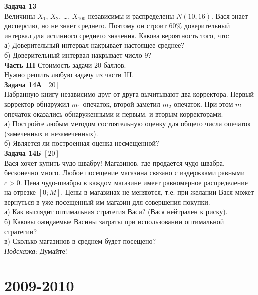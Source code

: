 \documentclass[12pt, a4paper]{article}\usepackage[]{graphicx}\usepackage[]{color}
\begin{document}
\textbf{Задача 13} \\
Величины $X_{1}$, $X_{2}$, \ldots, $X_{100}$ независимы и распределены $N(10,16)$. Вася знает дисперсию, но не знает среднего. Поэтому он строит 60\% доверительный интервал для истинного среднего значения. Какова вероятность того, что:\\
а) Доверительный интервал накрывает настоящее среднее? \\
б) Доверительный интервал накрывает число 9? \\

\textbf{Часть III} Стоимость задачи 20 баллов. \\

Нужно решить любую \textbf{} задачу из части III. \\


\textbf{Задача 14А} $[20]$ \\
Набранную книгу независимо друг от друга вычитывают два корректора. Первый корректор обнаружил $m_{1}$ опечаток, второй заметил $m_{2}$ опечаток. При этом $m$ опечаток оказались обнаруженными и первым, и вторым корректорами. \\
а) Постройте любым методом состоятельную оценку для общего числа опечаток (замеченных и незамеченных). \\
б) Является ли построенная оценка несмещенной? \\


\textbf{Задача 14Б} $[20]$ \\
Вася хочет купить чудо-швабру! Магазинов, где продается чудо-швабра, бесконечно много. Любое посещение магазина связано с издержками равными $c>0$. Цена чудо-швабры в каждом магазине имеет равномерное распределение на отрезке $[0;M]$. Цены в магазинах не меняются, т.е. при желании Вася может вернуться в уже посещенный им магазин для совершения покупки.\\
а) Как выглядит оптимальная стратегия Васи? (Вася нейтрален к риску). \\
б) Каковы ожидаемые Васины затраты при использовании оптимальной стратегии? \\
в) Сколько магазинов в среднем будет посещено? \\


\emph{Подсказка}: Думайте! \\





\section{2009-2010}
\end{document}
